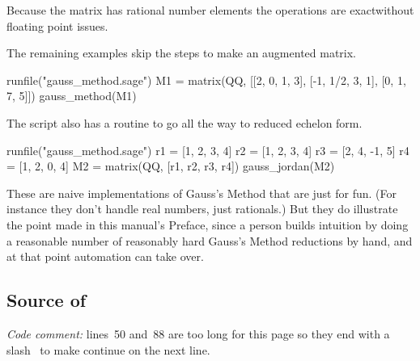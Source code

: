 Because the matrix has rational number elements the operations are 
exact\Dash without floating point issues.

The remaining examples skip the steps to make an augmented matrix. 
\begin{sageoutput}[d,0,1]
runfile("gauss_method.sage")
M1 = matrix(QQ, [[2, 0, 1, 3], [-1, 1/2, 3, 1], [0, 1, 7, 5]])
gauss_method(M1)
\end{sageoutput}

The script also has a routine to go all the way to reduced echelon form.
\begin{sageoutput}[d,0,1]
runfile("gauss_method.sage")
r1 = [1, 2, 3, 4]
r2 = [1, 2, 3, 4]
r3 = [2, 4, -1, 5]
r4 = [1, 2, 0, 4]
M2 = matrix(QQ, [r1, r2, r3, r4])
gauss_jordan(M2)            
\end{sageoutput}

These are naive implementations of Gauss's Method that are just for fun.
(For instance they don't handle real numbers, just rationals.)
But they do illustrate the point made in this manual's Preface, 
since a person
builds intuition by doing a reasonable number of reasonably hard Gauss's Method
reductions by hand, and at that point automation can take over.


\subsection{Source of \protect{}}
\textit{Code comment:} lines~50 and~88 are too long
for this page so they end with a 
slash~\inlinecode{\\} to make \python{} continue on the
next line. 


\endinput


TODO:
